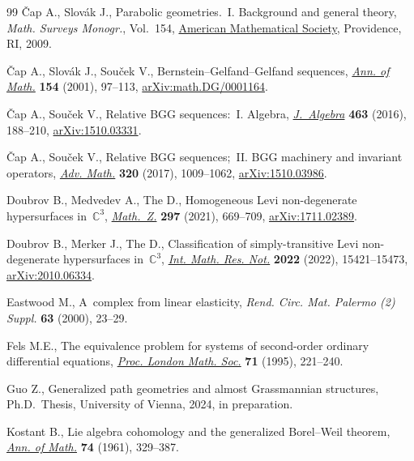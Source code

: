 \documentclass[pdftex]{sigma}
\numberwithin{equation}{section}
\begin{document}
\begin{thebibliography}{99}
{\v{C}}ap A., Slov\'ak J., Parabolic geometries.~{I}. Background and general
 theory, \textit{Math. Surveys Monogr.}, Vol.~154, \href{https://doi.org/10.1090/surv/154}{American Mathematical
 Society}, Providence, RI, 2009.

{\v{C}}ap A., Slov\'ak J., Sou\v{c}ek V., Bernstein--{G}elfand--{G}elfand
 sequences, \href{https://doi.org/10.2307/3062111}{\textit{Ann. of Math.}} \textbf{154} (2001), 97--113,
 \href{https://arxiv.org/abs/math.DG/0001164}{arXiv:math.DG/0001164}.

{\v{C}}ap A., Sou\v{c}ek V., Relative {BGG} sequences:~{I}. {A}lgebra,
 \href{https://doi.org/10.1016/j.jalgebra.2016.06.007}{\textit{J.~Algebra}} \textbf{463} (2016), 188--210, \href{https://arxiv.org/abs/1510.03331}{arXiv:1510.03331}.

{\v{C}}ap A., Sou\v{c}ek V., Relative {BGG} sequences;~{II}. {BGG} machinery
 and invariant operators, \href{https://doi.org/10.1016/j.aim.2017.09.016}{\textit{Adv. Math.}} \textbf{320} (2017), 1009--1062,
 \href{https://arxiv.org/abs/1510.03986}{arXiv:1510.03986}.

Doubrov B., Medvedev A., The D., Homogeneous {L}evi non-degenerate
 hypersurfaces in~{$\mathbb{C}^3$}, \href{https://doi.org/10.1007/s00209-020-02528-2}{\textit{Math.~Z.}} \textbf{297} (2021),
 669--709, \href{https://arxiv.org/abs/1711.02389}{arXiv:1711.02389}.

Doubrov B., Merker J., The D., Classification of simply-transitive {L}evi
 non-degenerate hypersurfaces in~{$\mathbb{C}^3$}, \href{https://doi.org/10.1093/imrn/rnab147}{\textit{Int. Math. Res.
 Not.}} \textbf{2022} (2022), 15421--15473, \href{https://arxiv.org/abs/2010.06334}{arXiv:2010.06334}.

Eastwood M., A~complex from linear elasticity, \textit{Rend. Circ. Mat. Palermo (2) Suppl.} \textbf{63} (2000), 23--29.

Fels M.E., The equivalence problem for systems of second-order ordinary
 differential equations, \href{https://doi.org/10.1112/plms/s3-71.1.221}{\textit{Proc. London Math. Soc.}} \textbf{71} (1995),
 221--240.

Guo Z., Generalized path geometries and almost {G}rassmannian structures, Ph.D.~Thesis, {U}niversity of Vienna, 2024, in preparation.

Kostant B., Lie algebra cohomology and the generalized {B}orel--{W}eil theorem,
 \href{https://doi.org/10.2307/1970237}{\textit{Ann. of Math.}} \textbf{74} (1961), 329--387.


\end{thebibliography}
\end{document}
